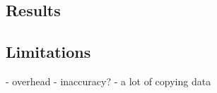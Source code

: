 \documentclass[paper=a4, fontsize=11pt]{scrartcl}
\numberwithin{equation}{section}		%
\numberwithin{figure}{section}			%
\numberwithin{table}{section}				%
\begin{document}
\subsection{Results}

\subsection{Limitations}

- overhead
- inaccuracy?
- a lot of copying data

\end{document}
